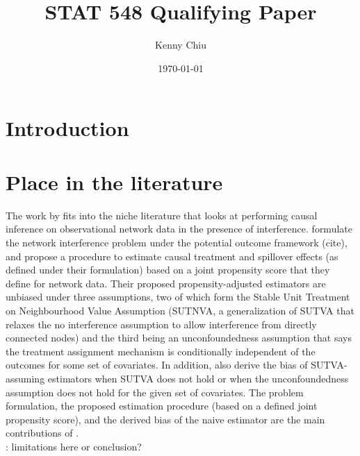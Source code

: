\documentclass[10pt]{article}
\title{\todo\\\vspace{0.5em}\large{STAT 548 Qualifying Paper}}
\author{Kenny Chiu}
\date{\today}
\begin{document}
\maketitle

\vspace{2em}

\begin{abstract}
\todo
\end{abstract}

\vspace{2em}


\section{Introduction}


\section{Place in the literature}

The work by \textcite{Forastiere:2021} fits into the niche literature that looks at performing causal inference on observational network data in the presence of interference. \textcite{Forastiere:2021} formulate the network interference problem under the potential outcome framework (\todo cite), and propose a procedure to estimate causal treatment and spillover effects (as defined under their formulation) based on a joint propensity score that they define for network data. Their proposed propensity-adjusted estimators are unbiased under three assumptions, two of which form the Stable Unit Treatment on Neighbourhood Value Assumption (SUTNVA, a generalization of SUTVA that relaxes the no interference assumption to allow interference from directly connected nodes) and the third being an unconfoundedness assumption that says the treatment assignment mechanism is conditionally independent of the outcomes for some set of covariates. In addition, \textcite{Forastiere:2021} also derive the bias of SUTVA-assuming estimators when SUTVA does not hold or when the unconfoundedness assumption does not hold for the given set of covariates. The problem formulation, the proposed estimation procedure (based on a defined joint propensity score), and the derived bias of the naive estimator are the main contributions of \citeauthor{Forastiere:2021}.
\\

\todo: limitations here or conclusion?
\\
\end{document}
